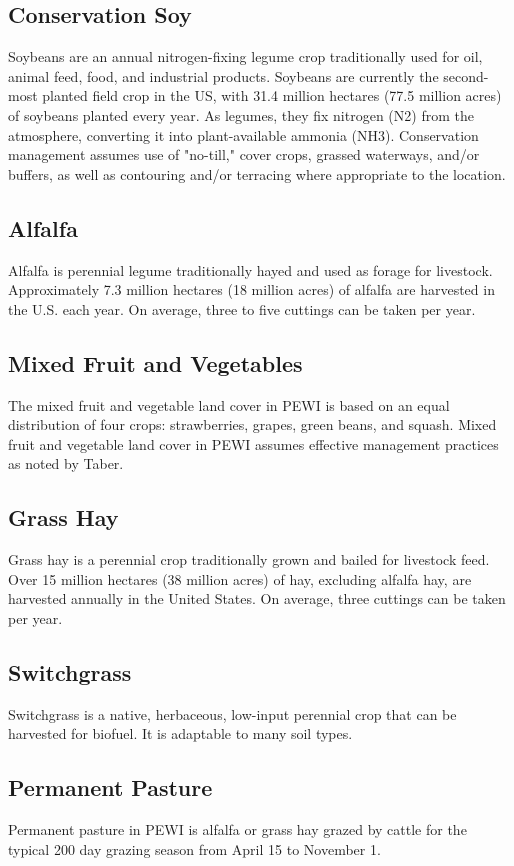 \documentclass[11pt]{article}
\begin{document}
\subsection{Conservation Soy}
Soybeans are an annual nitrogen-fixing legume crop traditionally used for oil, animal feed, food, and industrial products. Soybeans are currently the second-most planted field crop in the US, with 31.4 million hectares (77.5 million acres) of soybeans planted every year\cite{4}.  As legumes, they fix nitrogen (N2) from the atmosphere, converting it into plant-available ammonia (NH3). Conservation management assumes use of "no-till," cover crops, grassed waterways, and/or buffers, as well as contouring and/or terracing where appropriate to the location.

\subsection{Alfalfa}
Alfalfa is perennial legume traditionally hayed and used as forage for livestock. Approximately 7.3 million hectares (18 million acres) of alfalfa are harvested in the U.S. each year\cite{5}.  On average, three to five cuttings can be taken per year.

\subsection{Mixed Fruit and Vegetables}
The mixed fruit and vegetable land cover in PEWI is based on an equal distribution of four crops: strawberries, grapes, green beans, and squash. Mixed fruit and vegetable land cover in PEWI assumes effective management practices as noted by Taber.

\subsection{Grass Hay}
Grass hay is a perennial crop traditionally grown and bailed for livestock feed. Over 15 million hectares (38 million acres) of hay, excluding alfalfa hay, are harvested annually in the United States. On average, three cuttings can be taken per year. 

\subsection{Switchgrass}
Switchgrass is a native, herbaceous, low-input perennial crop that can be harvested for biofuel. It is adaptable to many soil types.

\subsection{Permanent Pasture}
Permanent pasture in PEWI is alfalfa or grass hay grazed by cattle for the typical 200 day grazing season from April 15 to November 1.\cite{10}
\end{document}
